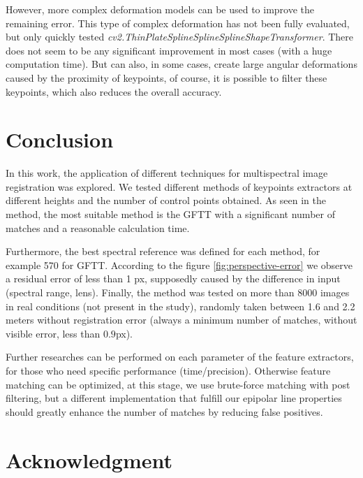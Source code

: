 \documentclass[]{elsarticle}
\begin{document}
	However, more complex deformation models \cite{10.1007/978-3-642-3-3-33709-3_3} can be used to improve the remaining error.
	This type of complex deformation has not been fully evaluated, but only quickly tested \textit{cv2.ThinPlateSplineSplineSplineShapeTransformer}.
	There does not seem to be any significant improvement in most cases (with a huge computation time).
	But can also, in some cases, create large angular deformations caused by the proximity of keypoints,
	of course, it is possible to filter these keypoints, which also reduces the overall accuracy.
	
	
	\section{Conclusion}
	
	In this work, the application of different techniques for multispectral image registration was explored.
	We tested different methods of keypoints extractors at different heights and the number of control points obtained.
	As seen in the method, the most suitable method is the GFTT with a significant number of matches and a reasonable calculation time.
	
	Furthermore, the best spectral reference was defined for each method, for example 570 for GFTT.
	According to the figure \ref{fig:perspective-error} we observe a residual error of less than 1 px,
	supposedly caused by the difference in input (spectral range, lens).
	Finally, the method was tested on more than 8000 images in real conditions (not present in the study),
	randomly taken between 1.6 and 2.2 meters without registration error (always a minimum number of matches, without visible error, less than $0.9$px).
	\\
	\par Further researches can be performed on each parameter of the feature extractors, for those who need specific performance (time/precision).
	Otherwise feature matching can be optimized, at this stage, we use brute-force matching with post filtering,
	but a different implementation that fulfill our epipolar line properties should greatly enhance the number of matches by reducing false positives.
	
	\newpage
	
	\section{Acknowledgment}
	
\end{document}
